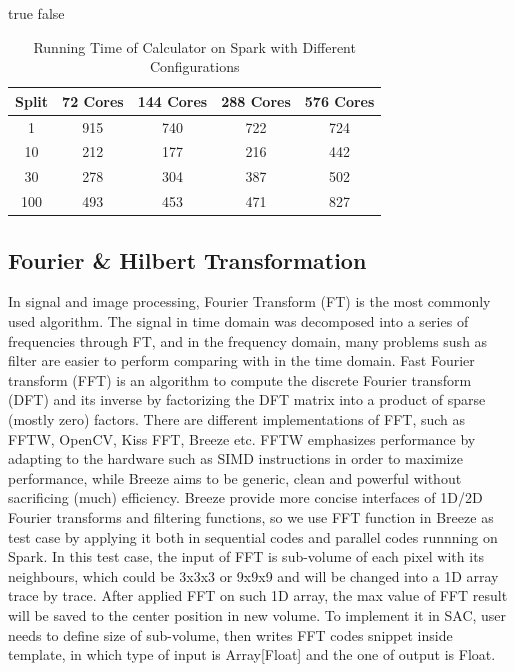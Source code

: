 \ifx true false
\begin{table}[h]
\caption{Running Time of Calculator on Spark with Different Configurations}
\centering
\begin{tabular}{||c| c c c c ||} 
 \hline
 Split & 72 Cores & 144 Cores & 288 Cores & 576 Cores \\ [0.5ex] 
 \hline
 1 & 915 & 740 & 722 & 724 \\ 
 10 & 212 & 177 & 216 & 442 \\
 30 & 278 & 304 & 387 & 502 \\
 100 & 493 & 453 & 471 & 827 \\
 \hline
\end{tabular}
\label{table:CalcSpark}
\end{table}
\fi

\subsection{Fourier \& Hilbert Transformation}
In signal and image processing, Fourier Transform (FT) is the most commonly used algorithm. The signal in time domain was decomposed into a series of frequencies  through FT, and in the frequency domain, many problems sush as filter are easier to perform comparing with in the time domain. Fast Fourier transform (FFT) \cite{FFTWiki} is an algorithm to compute the discrete Fourier transform (DFT) and its inverse by factorizing the DFT matrix into a product of sparse (mostly zero) factors. There are different implementations of FFT, such as FFTW, OpenCV, Kiss FFT, Breeze etc. FFTW\cite{FFTW05} emphasizes performance by adapting to the hardware such as SIMD instructions in order to maximize performance, while Breeze aims to be generic, clean and powerful without sacrificing (much) efficiency. Breeze provide more concise interfaces of 1D/2D Fourier transforms and filtering functions, so we use FFT function in Breeze as test case by applying it both in sequential codes and parallel codes runnning on Spark. In this test case, the input of FFT is sub-volume of each pixel with its neighbours, which could be 3x3x3 or 9x9x9 and will be changed into a 1D array trace by trace. After applied FFT on such 1D array, the max value of FFT result will be saved to the center position in new volume. To implement it in SAC, user needs to define size of sub-volume, then writes FFT codes snippet inside template, in which type of input is Array[Float] and the one of output is Float.   


